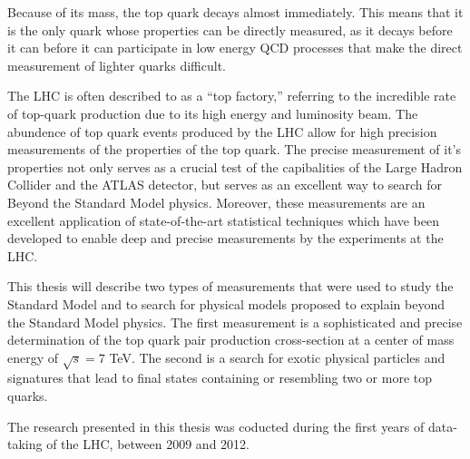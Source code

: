 Because of its mass, the top quark decays almost immediately.
This means that it is the only quark whose properties can be directly measured, as it decays before it can before it can participate in low energy QCD processes that make the direct measurement of lighter quarks difficult.

The LHC is often described to as a ``top factory,'' referring to the incredible rate of top-quark production due to its high energy and luminosity beam.
The abundence of top quark events produced by the LHC allow for high precision measurements of the properties of the top quark.
The precise measurement of it's properties not only serves as a crucial test of the capibalities of the Large Hadron Collider and the ATLAS detector, but serves as an excellent way to search for Beyond the Standard Model physics.
Moreover, these measurements are an excellent application of state-of-the-art statistical techniques which have been developed to enable deep and precise measurements by the experiments at the LHC.

This thesis will describe two types of measurements that were used to study the Standard Model and to search for physical models proposed to explain beyond the Standard Model physics.
The first measurement is a sophisticated and precise determination of the top quark pair production cross-section at a center of mass energy of $\sqrt{s} = 7$ TeV.
The second is a search for exotic physical particles and signatures that lead to final states containing or resembling two or more top quarks.

The research presented in this thesis was coducted during the first years of data-taking of the LHC, between 2009 and 2012.




